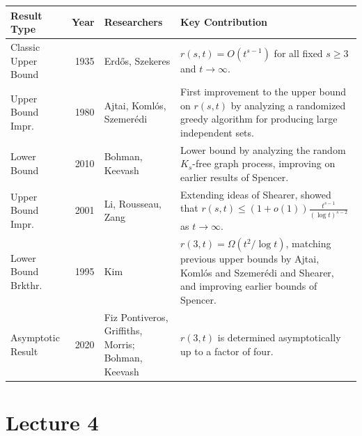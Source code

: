 \documentclass[11pt, a4paper]{ctexrep}
\begin{document}
\begin{table}[ht]
    \centering
    \renewcommand{\arraystretch}{1.2}
    \begin{tabularx}{\textwidth}{@{}>{\raggedright}p{3.2cm} r >{\raggedright}p{4.5cm} >{\raggedright\arraybackslash}X@{}}
        \toprule
        \textbf{Result Type} & \textbf{Year} & \textbf{Researchers}                               & \textbf{Key Contribution}                                                                                                                              \\
        \midrule
        Classic Upper Bound  & 1935          & Erd\H{o}s, Szekeres                                & $r(s,t) = O(t^{s-1})$ for all fixed $s \ge 3$ and $t \to \infty$.                                                                                      \\
        Upper Bound Impr.    & 1980          & Ajtai, Koml\'os, Szemer\'edi                       & First improvement to the upper bound on $r(s,t)$ by analyzing a randomized greedy algorithm for producing large independent sets.                      \\
        Lower Bound          & 2010          & Bohman, Keevash                                    & Lower bound by analyzing the random $K_s$-free graph process, improving on earlier results of Spencer.                                                 \\
        Upper Bound Impr.    & 2001          & Li, Rousseau, Zang                                 & Extending ideas of Shearer, showed that $r(s,t) \le (1+o(1))\frac{t^{s-1}}{(\log t)^{s-2}}$ as $t \to \infty$.                                         \\
        Lower Bound Brkthr.  & 1995          & Kim                                                & $r(3,t) = \Omega(t^2/\log t)$, matching previous upper bounds by Ajtai, Koml\'os and Szemer\'edi and Shearer, and improving earlier bounds of Spencer. \\
        Asymptotic Result    & 2020          & Fiz Pontiveros, Griffiths, Morris; Bohman, Keevash & $r(3,t)$ is determined asymptotically up to a factor of four.                                                                                          \\
        \bottomrule
    \end{tabularx}
\end{table}

\chapter{Lecture 4}
\end{document}
